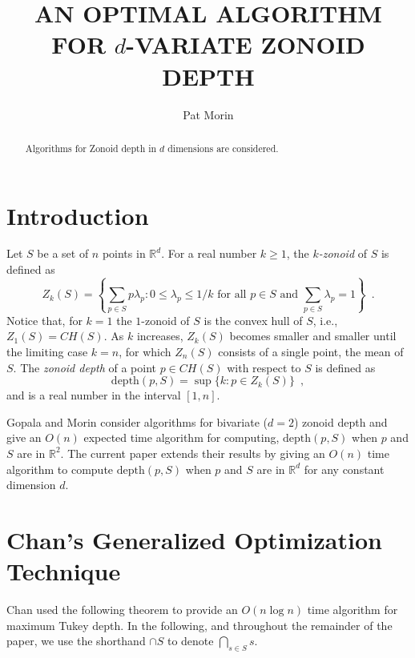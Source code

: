 \documentclass[lotsofwhite]{patmorin}
\title{\MakeUppercase{An Optimal Algorithm
	for} $d$\MakeUppercase{-Variate Zonoid Depth}}
\author{Pat Morin}
\date{}
\newcommand{\CH}{\mathit{CH}}
\newcommand{\Z}{\mathit{Z}}
\newcommand{\depth}{\mathrm{depth}}
\begin{document}
\maketitle
\begin{abstract}
Algorithms for Zonoid depth in $d$ dimensions are considered.
\end{abstract}

\section{Introduction}

Let $S$ be a set of $n$ points in $\mathbb{R}^d$.
For a real number $k\ge 1$, the \emph{$k$-zonoid} of $S$ is defined as 
\[
      \Z_k(S) = \left\{\sum_{p\in S}p\lambda_p 
	: \mbox{$0\le \lambda_p \le 1/k$ for all $p\in S$  
	   and $\sum_{p\in S}\lambda_p = 1$}  \right\} \enspace .
\] 
Notice that, for $k=1$ the $1$-zonoid of $S$ is the convex hull of
$S$,  i.e., $\Z_1(S)=\CH(S)$.
As $k$ increases, $\Z_k(S)$ becomes smaller and smaller until
the limiting case $k=n$, for which $\Z_n(S)$ consists of a single point,
the mean of $S$.  The \emph{zonoid depth} of a point
$p\in\CH(S)$ with respect to $S$ is defined as
\[
     \depth(p,S) = \sup\{k : p\in Z_k(S) \} \enspace ,
\]
and is a real number in the interval $[1,n]$.

Gopala and Morin \cite{gm06} consider algorithms for bivariate ($d=2$)
zonoid depth and give an $O(n)$ expected time algorithm for computing,
$\depth(p,S)$ when $p$ and $S$ are in $\mathbb{R}^2$.  The current
paper extends their results by giving an $O(n)$ time algorithm to compute
$\depth(p,S)$ when $p$ and $S$ are in $\mathbb{R}^d$ for any constant
dimension $d$.

\section{Chan's Generalized Optimization Technique}

Chan \cite{c2004} used the following theorem to provide an $O(n\log
n)$ time algorithm for maximum Tukey depth.  In the following, and
throughout the remainder of the paper, we use the shorthand $\cap S$
to denote $\bigcap_{s\in S}s$.
\end{document}
